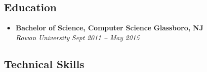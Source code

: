 \begin{itemize}
\begin{comment} %
  \item
  \headerrow
    {\textbf{Rowan University}}
    {\textbf{Glassboro, NJ}}
  \\
  \headerrow
    {\emph{Web Developer, History Department}}
    {\emph{Nov 2013 -- May 2015}}
  \begin{itemize*}
    \item Updated and maintained the History Department's website
  \end{itemize*}
  \headerrow
    {\emph{Network Assistant, Network \& System Services}}
    {\emph{Jul 2014 -- Sept 2014}}
  \begin{itemize*}
    \item Installed and maintained network infrastructure across the Glassboro campus
  \end{itemize*}
\end{comment}

\end{itemize}

\subsection*{Education}

\begin{itemize}
  \parskip=0.1em

  \item
  \headerrow
    {\textbf{Bachelor of Science, Computer Science}}
    {\textbf{Glassboro, NJ}}
  \\
  \headerrow
    {\emph{Rowan University}}
    {\emph{Sept 2011 -- May 2015}}

\end{itemize}

\subsection*{Technical Skills}

